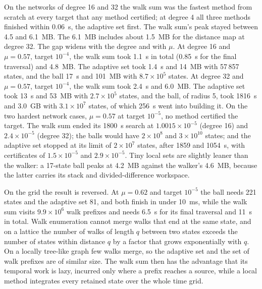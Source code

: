 On the networks of degree 16 and 32 the walk sum was the fastest method from scratch at every target that any method certified; at degree 4 all three methods finished within 0.06~s, the adaptive set first. The walk sum's peak stayed between 4.5 and 6.1~MB. The 6.1~MB includes about 1.5~MB for the distance map at degree 32. The gap widens with the degree and with $\mu$. At degree 16 and $\mu=0.57$, target $10^{-4}$, the walk sum took 1.1~s in total (0.85~s for the final traversal) and 4.8~MB. The adaptive set took 1.4~s and 14~MB with 57\,857 states, and the ball 17~s and 101~MB with $8.7\times10^5$ states. At degree 32 and $\mu=0.57$, target $10^{-4}$, the walk sum took 2.4~s and 6.0~MB. The adaptive set took 13~s and 53~MB with $2.7\times10^5$ states, and the ball, of radius 5, took 1816~s and 3.0~GB with $3.1\times10^7$ states, of which 256~s went into building it. On the two hardest network cases, $\mu=0.57$ at target $10^{-5}$, no method certified the target. The walk sum ended its 1800~s search at $1.0015\times10^{-5}$ (degree 16) and $2.4\times10^{-5}$ (degree 32); the balls would have $2\times10^8$ and $3\times10^{10}$ states; and the adaptive set stopped at its limit of $2\times10^7$ states, after 1859 and 1054~s, with certificates of $1.5\times10^{-5}$ and $2.9\times10^{-5}$. Tiny local sets are slightly leaner than the walker: a 17-state ball peaks at 4.2~MB against the walker's 4.6~MB, because the latter carries its stack and divided-difference workspace.

On the grid the result is reversed. At $\mu=0.62$ and target $10^{-5}$ the ball needs 221 states and the adaptive set 81, and both finish in under 10~ms, while the walk sum visits $9.9\times10^6$ walk prefixes and needs 6.5~s for its final traversal and 11~s in total. Walk enumeration cannot merge walks that end at the same state, and on a lattice the number of walks of length $q$ between two states exceeds the number of states within distance $q$ by a factor that grows exponentially with $q$. On a locally tree-like graph few walks merge, so the adaptive set and the set of walk prefixes are of similar size. The walk sum then has the advantage that its temporal work is lazy, incurred only where a prefix reaches a source, while a local method integrates every retained state over the whole time grid.

